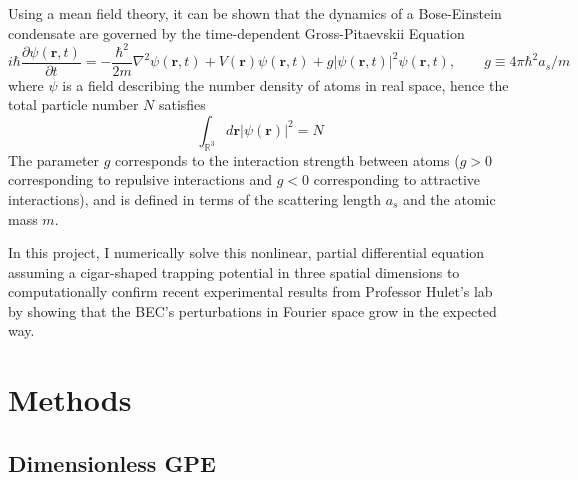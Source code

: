 \documentclass[12]{article}
\begin{document}
Using a mean field theory, it can be shown that the dynamics of a Bose-Einstein condensate are governed by the time-dependent Gross-Pitaevskii Equation \cite{pethick2008bose}
\begin{equation}
i \hbar \frac{\partial \psi(\mathbf{r}, t)}{\partial t}=-\frac{\hbar^{2}}{2 m} \nabla^{2} \psi(\mathbf{r}, t)+V(\mathbf{r}) \psi(\mathbf{r}, t)+ g|\psi(\mathbf{r}, t)|^{2} \psi(\mathbf{r}, t), \quad \quad g \equiv 4 \pi \hbar^{2} a_{s} / m
\label{DimGPE3D}
\end{equation}
\nolinebreak
where $\psi$ is a field describing the number density of atoms in real space, hence the total particle number $N$ satisfies
\begin{equation}
\int_{\mathbb{R}^{3}} d \mathbf{r}|\psi(\mathbf{r})|^{2} = N
\end{equation}
The parameter $g$ corresponds to the interaction strength between atoms ($g>0$ corresponding to repulsive interactions and $g < 0$ corresponding to attractive interactions), and is defined in terms of the scattering length $a_s$ and the atomic mass $m$.

In this project, I numerically solve this nonlinear, partial differential equation assuming a cigar-shaped trapping potential in three spatial dimensions to computationally confirm recent experimental results from Professor Hulet's lab by showing that the BEC's perturbations in Fourier space grow in the expected way.

\section{Methods}

\subsection{Dimensionless GPE}
\end{document}
